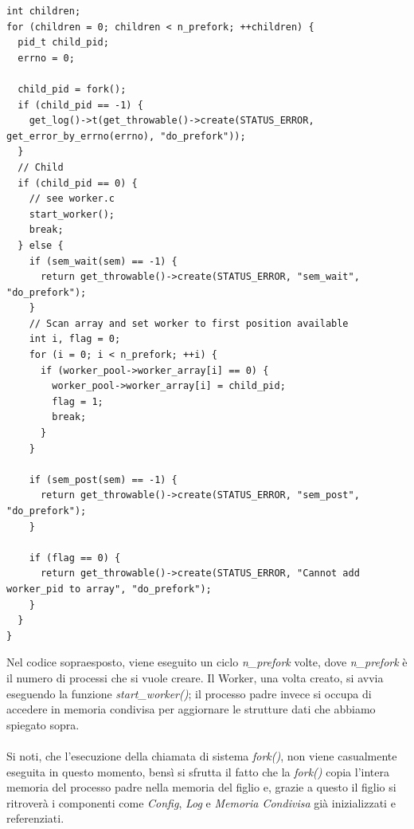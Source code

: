 \documentclass[italian]{tktltiki2}
\begin{document}
\begin{lstlisting}
int children;
for (children = 0; children < n_prefork; ++children) {
  pid_t child_pid;
  errno = 0;

  child_pid = fork();
  if (child_pid == -1) {
    get_log()->t(get_throwable()->create(STATUS_ERROR, get_error_by_errno(errno), "do_prefork"));
  }
  // Child 
  if (child_pid == 0) {
    // see worker.c
    start_worker();
    break;
  } else {
    if (sem_wait(sem) == -1) {
      return get_throwable()->create(STATUS_ERROR, "sem_wait", "do_prefork");
    }
    // Scan array and set worker to first position available
    int i, flag = 0;
    for (i = 0; i < n_prefork; ++i) {
      if (worker_pool->worker_array[i] == 0) {
        worker_pool->worker_array[i] = child_pid;
        flag = 1;
        break;
      }
    }

    if (sem_post(sem) == -1) {
      return get_throwable()->create(STATUS_ERROR, "sem_post", "do_prefork");
    }

    if (flag == 0) {
      return get_throwable()->create(STATUS_ERROR, "Cannot add worker_pid to array", "do_prefork");        
    }            
  }
}
\end{lstlisting}
Nel codice sopraesposto, viene eseguito un ciclo \emph{n\_prefork} volte, dove \emph{n\_prefork} è il numero di processi che si vuole creare. Il Worker, una volta creato, si avvia eseguendo la funzione \emph{start\_worker()}; il processo padre invece si occupa di accedere in memoria condivisa per aggiornare le strutture dati che abbiamo spiegato sopra. \\\\Si noti, che l'esecuzione della chiamata di sistema \emph{fork()}, non viene casualmente eseguita in questo momento, bensì si sfrutta il fatto che la \emph{fork()} copia l'intera memoria del processo padre nella memoria del figlio e, grazie a questo il figlio si ritroverà i componenti come \emph{Config}, \emph{Log} e \emph{Memoria Condivisa} già inizializzati e referenziati.
\end{document}
